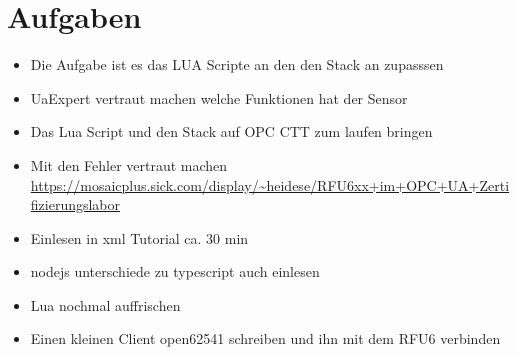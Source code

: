 \section{Aufgaben}
\begin{itemize}
    \item Die Aufgabe ist es das LUA Scripte an den den Stack an zupasssen
    \item UaExpert vertraut machen welche Funktionen hat der Sensor
    \item Das Lua Script und den Stack auf OPC CTT zum laufen bringen
    \item Mit den Fehler vertraut machen \url{https://mosaicplus.sick.com/display/~heidese/RFU6xx+im+OPC+UA+Zertifizierungslabor}
    \item Einlesen in xml Tutorial ca. 30 min
    \item nodejs unterschiede zu typescript auch einlesen 
    \item Lua nochmal auffrischen 
    \item Einen kleinen Client open62541 schreiben und ihn mit dem RFU6 verbinden
    
\end{itemize}



